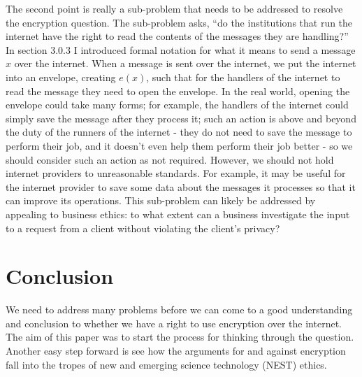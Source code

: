 \documentclass[11pt]{article}
\begin{document}
The second point is really a sub-problem that needs to be addressed to resolve the encryption question.
The sub-problem asks, ``do the institutions that run the internet have the right to read the contents of the messages they are handling?''
In section 3.0.3 I introduced formal notation for what it means to send a message $x$ over the internet.
When a message is sent over the internet, we put the internet into an envelope, creating $e(x)$, such that for the handlers of the internet to read the message they need to open the envelope.
In the real world, opening the envelope could take many forms; for example, the handlers of the internet could simply save the message after they process it; such an action is above and beyond the duty of the runners of the internet - they do not need to save the message to perform their job, and it doesn't even help them perform their job better - so we should consider such an action as not required.
However, we should not hold internet providers to unreasonable standards.
For example, it may be useful for the internet provider to save some data about the messages it processes so that it can improve its operations.
This sub-problem can likely be addressed by appealing to business ethics: to what extent can a business investigate the input to a request from a client without violating the client's privacy?

\section{Conclusion}
We need to address many problems before we can come to a good understanding and conclusion to whether we have a right to use encryption over the internet.
The aim of this paper was to start the process for thinking through the question.
Another easy step forward is see how the arguments for and against encryption fall into the tropes of new and emerging science technology (NEST) ethics.

%
%
\end{document}
